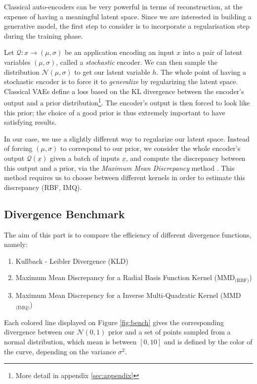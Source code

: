 \documentclass[11pt, english]{article}
\begin{document}
Classical auto-encoders can be very powerful in terms of reconstruction, at the expense of having a meaningful latent space. Since we are interested in building a generative model, the first step to consider is to incorporate a regularisation step during the training phase.\newline

Let $\mathcal Q: x \longrightarrow (\mu, \sigma)$ be an application encoding an input $x$ into a pair of latent variables $(\mu, \sigma)$, called a \textit{stochastic} encoder. We can then sample the distribution $\mathcal N(\mu, \sigma)$ to get our latent variable $h$. The whole point of having a stochastic encoder is to force it to \textit{generalize} by regularizing the latent space. Classical VAEs define a loss based on the KL divergence between the encoder's output and a prior distribution\footnote{\label{foot:appendix}More detail in appendix \ref{sec:appendix}}. The encoder's output is then forced to look like this prior; the choice of a good prior is thus extremely important to have satisfying results.\newline

In our case, we use a slightly different way to regularize our latent space. Instead of forcing $(\mu, \sigma)$ to correspond to our prior, we consider the whole encoder's output $\mathcal Q(\underline x)$ given a batch of inputs $\underline x$, and compute the discrepancy between this output and a prior, via the \textit{Maximum Mean Discrepancy} method . This method requires us to choose between different kernels in order to estimate this discrepancy (RBF, IMQ).
 
\subsection{Divergence Benchmark}
The aim of this part is to compare the efficiency of different divergence functions, namely:
\begin{enumerate}[noitemsep]
    \item Kullback - Leibler Divergence (KLD)
    \item Maximum Mean Discrepancy for a Radial Basis Function Kernel (MMD$_{\text{(RBF)}}$)
    \item Maximum Mean Discrepency for a Inverse Multi-Quadratic Kernel (MMD$_{\text{(IMQ)}}$)\newline
\end{enumerate}

\vspace{-0.5cm}
Each colored line displayed on Figure \ref{fig:bench} gives the corresponding divergence between our $\mathcal N(0,1)$ prior and a set of points sampled from a normal distribution, which mean is between $[0,10]$ and is defined by the color of the curve, depending on the variance $\sigma^2$.
\end{document}

